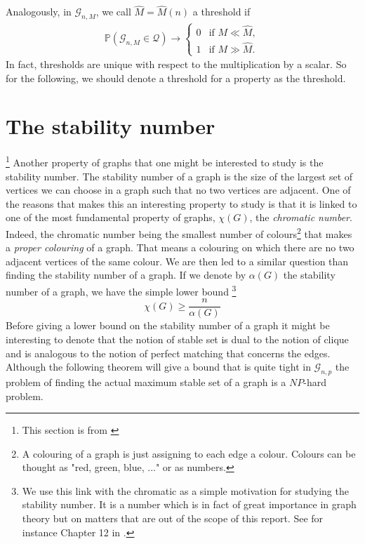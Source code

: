 Analogously, in $\mathcal{G}_{n, M}$, we call $\hat{M} = \hat{M}(n)$ a threshold if
\begin{align}
	\mathbb{P}(\mathcal{G}_{n,M} \in \mathcal{Q}) \rightarrow \left\{\begin{array}{rl}
										0 & \text{if } M \ll \hat{M},\\
										1 & \text{if } M \gg \hat{M}.
									 \end{array}
									\right.
\end{align}
In fact, thresholds are unique with respect to the multiplication by a scalar. So for the following, we should denote a threshold for a property as the threshold.


\section{The stability number}\footnote{This section is from \cite{Bondy08}}
Another property of graphs that one might be interested to study is the stability number. The stability number of a graph is the size of the largest set of vertices we can choose in a graph such that no two vertices are adjacent. 
One of the reasons that makes this an interesting property to study is that it is linked to one of the most fundamental property of graphs, $\chi (G)$, the \emph{chromatic number}. Indeed, the chromatic number being the smallest number of colours\footnote{A colouring of a graph is just assigning to each edge a colour. Colours can be thought as "red, green, blue, ..." or as numbers.} that makes a \emph{proper colouring} of a graph. 
That means a colouring on which there are no two adjacent vertices of the same colour. 
We are then led to a similar question than finding the stability number of a graph.
If we denote by $\alpha(G)$ the stability number of a graph, we have the simple lower bound \footnote{ We use this link with the chromatic as a simple motivation for studying the stability number. It is a number which is in fact of great importance in graph theory but on matters that are out of the scope of this report. See for instance Chapter 12 in \cite{Bondy08}.}
\begin{equation}
	\chi(G) \geq \frac{n}{\alpha(G)}
\end{equation}
Before giving a lower bound on the stability number of a graph it might be interesting to denote that the notion of stable set is dual to the notion of clique and is analogous to the notion of perfect matching that concerns the edges.
Although the following theorem will give a bound that is quite tight in $\mathcal{G}_{n, p}$ the problem of finding the actual maximum stable set of a graph is a $NP$-hard problem.
